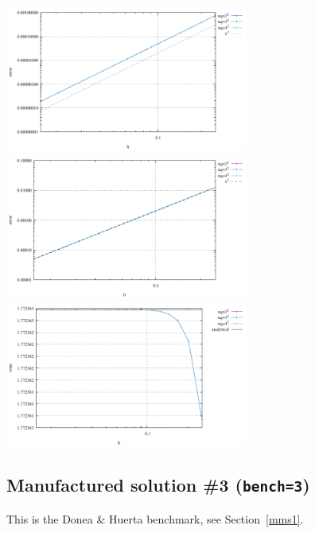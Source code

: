 \begin{center}
\includegraphics[width=8cm]{python_codes/fieldstone_76/results/mms2/errors_v}
\includegraphics[width=8cm]{python_codes/fieldstone_76/results/mms2/errors_p}\\
\includegraphics[width=8cm]{python_codes/fieldstone_76/results/mms2/vrms}
\end{center}

\subsection*{Manufactured solution \#3 ({\tt bench=3})}

This is the Donea \& Huerta benchmark, see Section~\ref{mms1}.

